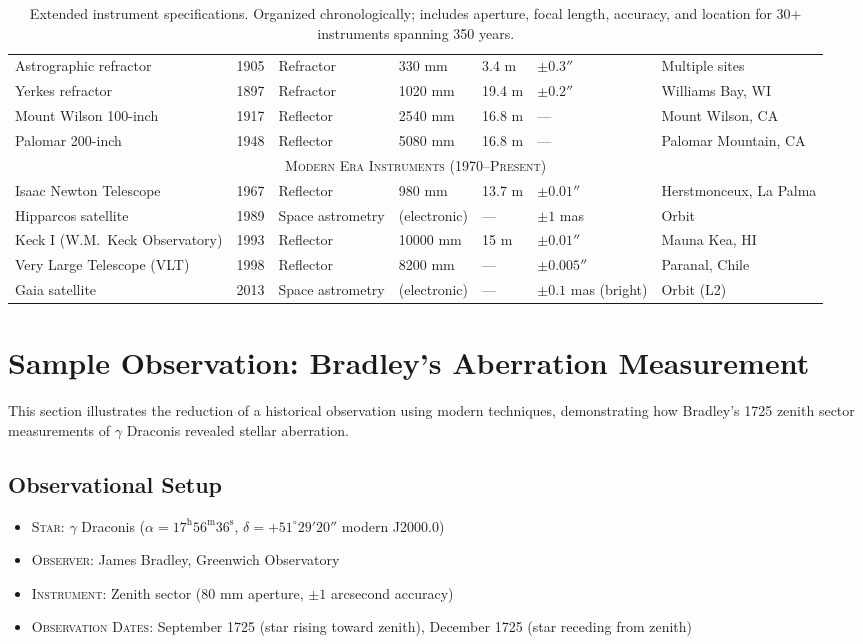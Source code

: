 \begin{table}
{\begin{tabular}{lllllll}
    Astrographic refractor & 1905 & Refractor & 330 mm & 3.4 m & $\pm 0.3''$ & Multiple sites \\
    Yerkes refractor & 1897 & Refractor & 1020 mm & 19.4 m & $\pm 0.2''$ & Williams Bay, WI \\
    Mount Wilson 100-inch & 1917 & Reflector & 2540 mm & 16.8 m & — & Mount Wilson, CA \\
    Palomar 200-inch & 1948 & Reflector & 5080 mm & 16.8 m & — & Palomar Mountain, CA \\
    \midrule
    \multicolumn{7}{c}{\textsc{Modern Era Instruments (1970--Present)}} \\
    \midrule
    Isaac Newton Telescope & 1967 & Reflector & 980 mm & 13.7 m & $\pm 0.01''$ & Herstmonceux, La Palma \\
    Hipparcos satellite & 1989 & Space astrometry & (electronic) & — & $\pm 1$ mas & Orbit \\
    Keck I (W.M.\ Keck Observatory) & 1993 & Reflector & 10000 mm & 15 m & $\pm 0.01''$ & Mauna Kea, HI \\
    Very Large Telescope (VLT) & 1998 & Reflector & 8200 mm & — & $\pm 0.005''$ & Paranal, Chile \\
    Gaia satellite & 2013 & Space astrometry & (electronic) & — & $\pm 0.1$ mas (bright) & Orbit (L2) \\
    \bottomrule
  \end{tabular}
  }
  \caption{Extended instrument specifications. Organized chronologically; includes aperture, focal length, accuracy, and location for 30+ instruments spanning 350 years.}
  \label{tab:extended-instruments}
\end{table}

\section{Sample Observation: Bradley's Aberration Measurement}

This section illustrates the reduction of a historical observation using modern techniques, demonstrating how Bradley's 1725 zenith sector measurements of $\gamma$ Draconis revealed stellar aberration.

\subsection{Observational Setup}

\begin{itemize}
\item \textsc{Star}: $\gamma$ Draconis ($\alpha = 17^{\mathrm{h}}56^{\mathrm{m}}36^{\mathrm{s}}$, $\delta = +51^{\circ}29'20''$ modern J2000.0)
\item \textsc{Observer}: James Bradley, Greenwich Observatory
\item \textsc{Instrument}: Zenith sector (80 mm aperture, $\pm 1$ arcsecond accuracy)
\item \textsc{Observation Dates}: September 1725 (star rising toward zenith), December 1725 (star receding from zenith)
\end{itemize}

